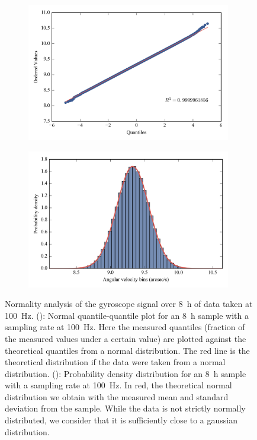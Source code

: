 \begin{figure}[!ht]

\begin{subfigure}[b]{0.5\textwidth}
		\centering
		\includegraphics[width=0.98\textwidth]{Figures/qqplot_11005.png} 
		\caption{}
		\label{subfig:probplot11005}
\end{subfigure}
\begin{subfigure}[b]{0.5\textwidth}
		\centering
		\includegraphics[width=0.98\textwidth]{Figures/distrib_11005.png} 
		\caption{}
		\label{subfig:density11005}
\end{subfigure}
\caption[Normality analysis]{Normality analysis of the gyroscope signal over \SI{8}{\hour} of data taken at \SI{100}{\hertz}. (): Normal quantile-quantile plot for an \SI{8}{\hour} sample with a sampling rate at \SI{100}{\hertz}. Here the measured quantiles (fraction of the measured values under a certain value) are plotted against the theoretical quantiles from a normal distribution. The red line is the theoretical distribution if the data were taken from a normal distribution. (): Probability density distribution for an \SI{8}{\hour} sample with a sampling rate at \SI{100}{\hertz}. In red, the theoretical normal distribution we obtain with the measured mean and standard deviation from the sample. While the data is not strictly normally distributed, we consider that it is sufficiently close to a gaussian distribution.}
\label{fig:gyroprobdensity}
\end{figure}




